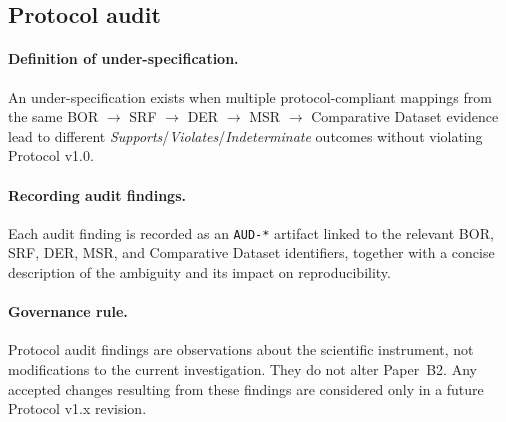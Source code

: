 \subsection{Protocol audit}
\label{sec:protocol-audit}
\paragraph{Definition of under-specification.}
An under-specification exists when multiple protocol-compliant mappings from the same BOR $\rightarrow$ SRF $\rightarrow$ DER $\rightarrow$ MSR $\rightarrow$ Comparative Dataset evidence lead to different \emph{Supports}/\emph{Violates}/\emph{Indeterminate} outcomes without violating Protocol v1.0.

\paragraph{Recording audit findings.}
Each audit finding is recorded as an \texttt{AUD-*} artifact linked to the relevant BOR, SRF, DER, MSR, and Comparative Dataset identifiers, together with a concise description of the ambiguity and its impact on reproducibility.

\paragraph{Governance rule.}
Protocol audit findings are observations about the scientific instrument, not modifications to the current investigation. They do not alter Paper~B2. Any accepted changes resulting from these findings are considered only in a future Protocol v1.x revision.
